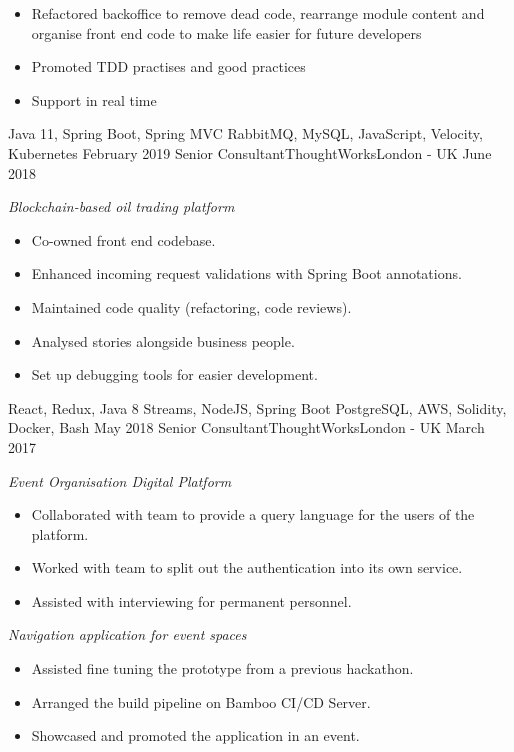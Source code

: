 \begin{experiences}
{\begin{itemize}
          \item Refactored backoffice to remove dead code, rearrange module content and organise front end code to make life easier for future developers
          \item Promoted TDD practises and good practices
          \item Support in real time
        \end{itemize}
      }
      {Java 11, Spring Boot, Spring MVC}
      {RabbitMQ, MySQL, JavaScript, Velocity, Kubernetes}
    \emptySeparator
    \experience
      {February 2019}
      {Senior Consultant}{ThoughtWorks}{London - UK}
      {June 2018}
      {
        \emph{Blockchain-based oil trading platform}
        \begin{itemize}
          \item Co-owned front end codebase.
          \item Enhanced incoming request validations with Spring Boot annotations.
          \item Maintained code quality (refactoring, code reviews).
          \item Analysed stories alongside business people.
          \item Set up debugging tools for easier development.
        \end{itemize}
      }
      {React, Redux, Java 8 Streams, NodeJS, Spring Boot}
      {PostgreSQL, AWS, Solidity, Docker, Bash}
    \emptySeparator
    \experience
      {May 2018}
      {Senior Consultant}{ThoughtWorks}{London - UK}
      {March 2017}
      {
        \emph{Event Organisation Digital Platform}
        \begin{itemize}
          \item Collaborated with team to provide a query language for the users of the platform.
          \item Worked with team to split out the authentication into its own service.
          \item Assisted with interviewing for permanent personnel.
        \end{itemize}

        \emph{Navigation application for event spaces}
        \begin{itemize}
          \item Assisted fine tuning the prototype from a previous hackathon.
          \item Arranged the build pipeline on Bamboo CI/CD Server.
          \item Showcased and promoted the application in an event.
        \end{itemize}

}
\end{experiences}
